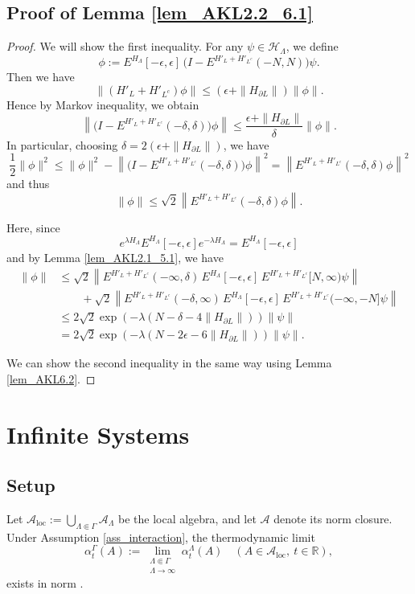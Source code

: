 \documentclass[11pt]{article}
\numberwithin{equation}{section}
\begin{document}
\subsection{Proof of Lemma \ref{lem_AKL2.2_6.1}}\label{S_AKL2.2_6.1}
\begin{proof}
We will show the first inequality. For any $\psi\in\mathcal{H}_\Lambda$, we define
\[
\phi:=E^{H_\Lambda}[-\epsilon,\epsilon]\, \Big(I-E^{H'_L+H'_{L^c}}(-N,N)\Big)\psi.
\]
Then we have
\[
\|(H'_L+H'_{L^c})\phi\|\leq(\epsilon+\|H_{\partial L}\|)\|\phi\|.
\]
Hence by Markov inequality, we obtain
\[
\left\|\Big(I-E^{H'_L+H'_{L^c}}(-\delta,\delta)\Big)\phi\right\|
\leq\frac{\epsilon+\|H_{\partial L}\|}{\delta}\|\phi\|.
\]
In particular, choosing $\delta=2(\epsilon+\|H_{\partial L}\|)$, we have
\[
\frac{1}{2}\|\phi\|^2
\leq\|\phi\|^2-\left\|\Big(I-E^{H'_L+H'_{L^c}}(-\delta,\delta)\Big)\phi\right\|^2
=\left\|E^{H'_L+H'_{L^c}}(-\delta,\delta)\phi\right\|^2
\]
and thus
\[
\|\phi\|\leq\sqrt{2}\left\|E^{H'_L+H'_{L^c}}(-\delta,\delta)\phi\right\|.
\]

Here, since
\[
e^{\lambda H_\Lambda}E^{H_\Lambda}[-\epsilon,\epsilon]e^{-\lambda H_\Lambda}=E^{H_\Lambda}[-\epsilon,\epsilon]
\]
and by Lemma \ref{lem_AKL2.1_5.1}, we have
\begin{align*}
\|\phi\|
&\leq \sqrt{2}\left\|
E^{H'_L+H'_{L^c}}(-\infty,\delta)\,
E^{H_\Lambda}[-\epsilon,\epsilon]\,
E^{H'_L+H'_{L^c}}[N,\infty) \psi\right\|\\
&\qquad+\sqrt{2}\left\|
E^{H'_L+H'_{L^c}}(-\delta,\infty)\,
E^{H_\Lambda}[-\epsilon,\epsilon]\,
E^{H'_L+H'_{L^c}}(-\infty,-N]\psi\right\|\\
&\leq 2\sqrt{2}\exp(-\lambda(N-\delta-4\|H_{\partial L}\|))\|\psi\|\\
&=2\sqrt{2}\exp(-\lambda(N-2\epsilon-6\|H_{\partial L}\|))\|\psi\|.
\end{align*}

We can show the second inequality in the same way using Lemma \ref{lem_AKL6.2}.
\end{proof}

\newpage
\section{Infinite Systems}\label{S_infinite}
\subsection{Setup}
Let
\(
\mathcal{A}_{\mathrm{loc}}
:=\bigcup_{\Lambda\Subset\Gamma}\mathcal{A}_\Lambda
\)
be the local algebra, and let $\mathcal{A}$ denote its norm closure. Under Assumption \ref{ass_interaction}, the thermodynamic limit
\begin{equation}\label{eq_dynamic}
\alpha_t^\Gamma(A)
:=\lim_{\substack{\Lambda\Subset\Gamma\\ \Lambda\to\infty}}\alpha_t^\Lambda(A)
\quad(A\in\mathcal{A}_{\mathrm{loc}},\ t\in\mathbb{R}),
\end{equation}
exists in norm \cite[Theorem 3.5]{Nachtergaele-Sims-Young}.
\end{document}
